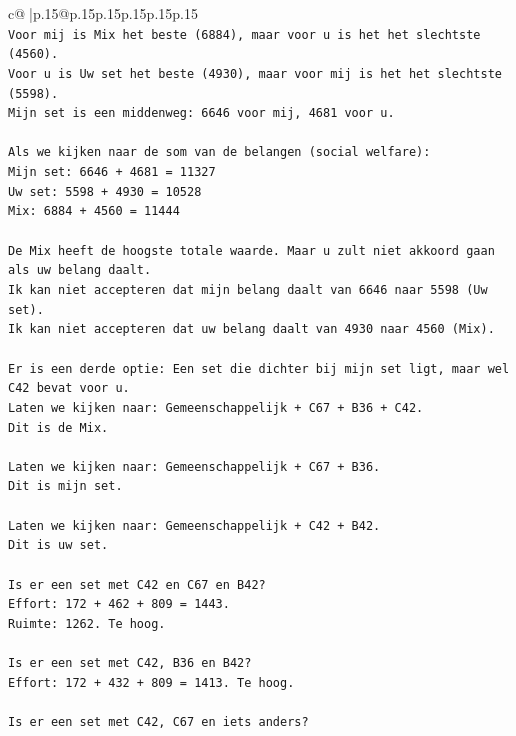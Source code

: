 \documentclass{article}
\begin{document}
{\begin{supertabular}{c@{$\;$}|p{.15\linewidth}@{}p{.15\linewidth}p{.15\linewidth}p{.15\linewidth}p{.15\linewidth}p{.15\linewidth}}
{{{\\ 
\texttt{Voor mij is Mix het beste (6884), maar voor u is het het slechtste (4560).} \\
\texttt{Voor u is Uw set het beste (4930), maar voor mij is het het slechtste (5598).} \\
\texttt{Mijn set is een middenweg: 6646 voor mij, 4681 voor u.} \\
\\ 
\texttt{Als we kijken naar de som van de belangen (social welfare):} \\
\texttt{Mijn set: 6646 + 4681 = 11327} \\
\texttt{Uw set: 5598 + 4930 = 10528} \\
\texttt{Mix: 6884 + 4560 = 11444} \\
\\ 
\texttt{De Mix heeft de hoogste totale waarde. Maar u zult niet akkoord gaan als uw belang daalt.} \\
\texttt{Ik kan niet accepteren dat mijn belang daalt van 6646 naar 5598 (Uw set).} \\
\texttt{Ik kan niet accepteren dat uw belang daalt van 4930 naar 4560 (Mix).} \\
\\ 
\texttt{Er is een derde optie: Een set die dichter bij mijn set ligt, maar wel C42 bevat voor u.} \\
\texttt{Laten we kijken naar: Gemeenschappelijk + C67 + B36 + C42.} \\
\texttt{Dit is de Mix.} \\
\\ 
\texttt{Laten we kijken naar: Gemeenschappelijk + C67 + B36.} \\
\texttt{Dit is mijn set.} \\
\\ 
\texttt{Laten we kijken naar: Gemeenschappelijk + C42 + B42.} \\
\texttt{Dit is uw set.} \\
\\ 
\texttt{Is er een set met C42 en C67 en B42?} \\
\texttt{Effort: 172 + 462 + 809 = 1443.} \\
\texttt{Ruimte: 1262. Te hoog.} \\
\\ 
\texttt{Is er een set met C42, B36 en B42?} \\
\texttt{Effort: 172 + 432 + 809 = 1413. Te hoog.} \\
\\ 
\texttt{Is er een set met C42, C67 en iets anders?} \\
}}}
\end{supertabular}}
\end{document}
